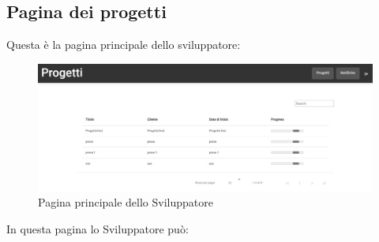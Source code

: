 \documentclass{article}
\begin{document}
\subsection{Pagina dei progetti}
Questa è la pagina principale dello sviluppatore:
 \begin{figure}[H]
      \centering
      \includegraphics[width=\textwidth]{documenti/Screenshot manuale utente/home dev.jpeg}
      \caption{Pagina principale dello Sviluppatore}
      \label{pagdev}
    \end{figure} 
In questa pagina lo Sviluppatore può:
\end{document}
